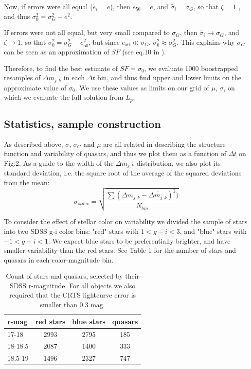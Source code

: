 \documentclass[fleqn,usenatbib]{mnras}  %
\begin{document}
Now, if errors were all equal ($e_{i} = e$), then $e_{50} = e$, and $\tilde{\sigma_{i}}= \sigma_{G}$, so that $\zeta=1$ , and thus $\sigma_{0}^{2} = \sigma_{G}^{2} - e^{2}$. 

If errors were not all equal, but very small compared to $\sigma_{G}$, then $\tilde{\sigma_{i}} \to \sigma_{G}$, and $\zeta \to 1$, so that  $\sigma_{0}^{2} = \sigma_{G}^{2} - e_{50}^{2}$, but since $e_{50} \ll \sigma_{G}$,  $\sigma_{0}^{2} \approx \sigma_{G}^{2}$. This explains why $\sigma_{G}$ can be seen as an approximation of $SF$ (see eq.10 in \cite{kozlowski2016}). 

Therefore, to find the best estimate of $SF = \sigma_{0}$, we evaluate 1000 boostrapped resamples of $\Delta m_{j,k}$ in each $\Delta t$ bin, and thus find upper and lower limits on the approximate value of $\sigma_{0}$. We use these values as limits on our grid  of  $\mu$, $\sigma$, on which we evaluate the full solution from  $L_{p}$. 


\subsection{Statistics, sample construction}
\label{sec:stats}
As described above, $\sigma$, $\sigma_{G}$ and $\mu$ are all related in describing the structure function and variability of quasars, and thus we plot them as a function of $\Delta t$ on Fig.2. As a guide to the width of the $\Delta m_{j,k}$ distribution, we also plot its standard deviation, i.e. the square root of the average of the squared deviations from the mean:
\begin{equation}
\sigma_{stdev} = \sqrt{\frac{\sum(\Delta m_{j,k} - \overline{\Delta m_{j,k}})^{2})}{ N_{bin}}}
\end{equation}

To consider the effect of stellar color on variability we divided the sample of stars into two SDSS g-i color bins: "red" stars with $1<g-i<3$, and  "blue" stars with $-1<g-i<1$. We expect blue stars to be preferentially brighter, and have smaller variability than the red stars. See Table 1 for the number of stars and quasars in each color-magnitude bin. 

\begin{table}

\caption{Count of stars and quasars, selected by their SDSS r-magnitude. For all objects we also required that the CRTS lightcurve error is smaller than $0.3$ mag.}
\label{tab:object_count}
\begin{tabular}{ l|ccc } 
r-mag  & red stars & blue stars & quasars \\ 
 \hline
17-18   & 2993 & 2795   & 185    \\ 
18-18.5 & 2087 &  1400  & 333   \\ 
18.5-19 & 1496 &  2327  & 747   
\end{tabular}
\end{table}
 
\end{document}
